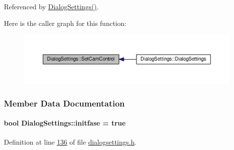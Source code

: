 Referenced by \hyperlink{dialogsettings_8cpp_source_l00005}{Dialog\+Settings()}.



Here is the caller graph for this function\+:
\nopagebreak
\begin{figure}[H]
\begin{center}
\leavevmode
\includegraphics[width=350pt]{class_dialog_settings_a0ee5b471d5007d534e3ed558064d12be_icgraph}
\end{center}
\end{figure}




\subsubsection{Member Data Documentation}
\hypertarget{class_dialog_settings_aeff07458ed6d4469cc16f90971bc5083}{}
\paragraph[{initfase}]{\setlength{\rightskip}{0pt plus 5cm}bool Dialog\+Settings\+::initfase = true\hspace{0.3cm}{\ttfamily [private]}}\label{class_dialog_settings_aeff07458ed6d4469cc16f90971bc5083}


Definition at line \hyperlink{dialogsettings_8h_source_l00136}{136} of file \hyperlink{dialogsettings_8h_source}{dialogsettings.\+h}.



